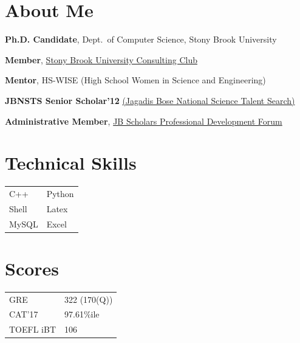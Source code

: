 \documentclass[letterpaper,10pt]{article}
\begin{document}
\begin{minipage}{0.65\textwidth}
\section*{About Me}
\resumeSubHeadingListStart
\item \textbf{Ph.D. Candidate}, Dept.\ of Computer Science, Stony Brook University
\item \textbf{Member}, \href{https://sbuconsultingclub.wixsite.com/sbucc}{Stony Brook University Consulting Club} 
\item \textbf{Mentor}, HS-WISE (High School Women in Science and Engineering)
\item \textbf{JBNSTS Senior Scholar'12} \href{https://jbnsts.ac.in}{(Jagadis Bose National Science Talent Search)}
\item \textbf{Administrative Member}, \href{https://sites.google.com/view/jbspdf/home}{JB Scholars Professional Development Forum}
\resumeSubHeadingListEnd
\end{minipage}
\begin{minipage}{0.1\textwidth}
\end{minipage}
\begin{minipage}{0.25\textwidth}
\section*{Technical Skills}
\begin{center}
\begin{tabular*}{\textwidth}{ m{3cm} m{2cm} }
\rowcolor{Gray} C++ & Python \\
\rowcolor{Gray} Shell & Latex \\
\rowcolor{Gray} MySQL & Excel \\
\end{tabular*}
\end{center}
\section*{Scores}
\begin{center}
\begin{tabular*}{\textwidth}{ m{3cm} m{2cm} }
\rowcolor{Gray} GRE & 322 (170(Q)) \\
\rowcolor{Gray} CAT'17 & 97.61\%ile \\
\rowcolor{Gray} TOEFL iBT & 106 \\
\end{tabular*}
\end{center}
\end{minipage}
\end{document}
